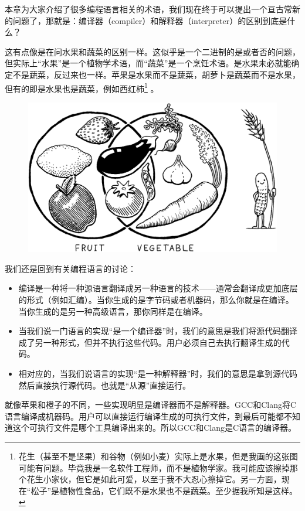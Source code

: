 \documentclass[cn,10pt,math=newtx,citestyle=gb7714-2015,bibstyle=gb7714-2015]{elegantbook}
\begin{document}
本章为大家介绍了很多编程语言相关的术语，我们现在终于可以提出一个亘古常新的问题了，那就是：编译器（compiler）和解释器（interpreter）的区别到底是什么？

这有点像是在问水果和蔬菜的区别一样。这似乎是一个二进制的是或者否的问题，但实际上“水果”是一个植物学术语，而“蔬菜”是一个烹饪术语。是水果未必就能确定不是蔬菜，反过来也一样。苹果是水果而不是蔬菜，胡萝卜是蔬菜而不是水果，但有的即是水果也是蔬菜，例如西红柿\footnote{花生（甚至不是坚果）和谷物（例如小麦）实际上是水果，但是我画的这张图可能有问题。毕竟我是一名软件工程师，而不是植物学家。我可能应该擦掉那个花生小家伙，但它是如此可爱，以至于我不大忍心擦掉它。另一方面，现在“松子”是植物性食品，它们既不是水果也不是蔬菜。至少据我所知是这样。} 。

\begin{figure}[h]
\centering
\includegraphics[width=\textwidth]{./image/a-map-of-the-territory/plants.png}
\end{figure}

我们还是回到有关编程语言的讨论：

\begin{itemize}
\item 编译是一种将一种源语言翻译成另一种语言的技术——通常会翻译成更加底层的形式（例如汇编）。当你生成的是字节码或者机器码，那么你就是在编译。当你生成的是另一种高级语言，那你同样是在编译。
\item 当我们说一门语言的实现“是一个编译器”时，我们的意思是我们将源代码翻译成了另一种形式，但并不执行这些代码。用户必须自己去执行翻译生成的代码。
\item 相对应的，当我们说语言的实现“是一种解释器”时，我们的意思是拿到源代码然后直接执行源代码。也就是“从源”直接运行。
\end{itemize}

就像苹果和橙子的不同，一些实现明显是编译器而不是解释器。GCC和Clang将C语言编译成机器码。用户可以直接运行编译生成的可执行文件，到最后可能都不知道这个可执行文件是哪个工具编译出来的。所以GCC和Clang是C语言的编译器。
\end{document}
